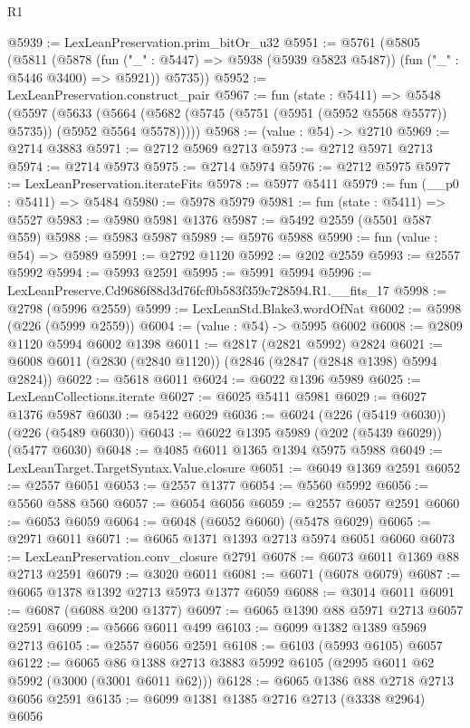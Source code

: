 \begin{lexlean}{R1}
\begin{coremodule}
@5939 := LexLeanPreservation.prim_bitOr_u32
@5951 := @5761
    (@5805
      (@5811
        (@5878 (fun ("_" : @5447) => @5938 (@5939 @5823 @5487)) (fun ("_" : @5446 @3400) => @5921))
        @5735))
@5952 := LexLeanPreservation.construct_pair
@5967 := fun (state : @5411) =>
  @5548
    (@5597
      (@5633 (@5664 (@5682 (@5745 (@5751 (@5951 (@5952 @5568 @5577)) @5735)) (@5952 @5564 @5578)))))
@5968 := (value : @54) -> @2710
@5969 := @2714 @3883
@5971 := @2712 @5969 @2713
@5973 := @2712 @5971 @2713
@5974 := @2714 @5973
@5975 := @2714 @5974
@5976 := @2712 @5975
@5977 := LexLeanPreservation.iterateFits
@5978 := @5977 @5411
@5979 := fun (__p0 : @5411) => @5484
@5980 := @5978 @5979
@5981 := fun (state : @5411) => @5527
@5983 := @5980 @5981 @1376
@5987 := @5492 @2559 (@5501 @587 @559)
@5988 := @5983 @5987
@5989 := @5976 @5988
@5990 := fun (value : @54) => @5989
@5991 := @2792 @1120
@5992 := @202 @2559
@5993 := @2557 @5992
@5994 := @5993 @2591
@5995 := @5991 @5994
@5996 := LexLeanPreserve.Cd9686f88d3d76fcf0b583f359c728594.R1.__fits_17
@5998 := @2798 (@5996 @2559)
@5999 := LexLeanStd.Blake3.wordOfNat
@6002 := @5998 (@226 (@5999 @2559))
@6004 := (value : @54) -> @5995 @6002
@6008 := @2809 @1120 @5994 @6002 @1398
@6011 := @2817 (@2821 @5992) @2824
@6021 := @6008 @6011 (@2830 (@2840 @1120)) (@2846 (@2847 (@2848 @1398) @5994 @2824))
@6022 := @5618 @6011
@6024 := @6022 @1396 @5989
@6025 := LexLeanCollections.iterate
@6027 := @6025 @5411 @5981
@6029 := @6027 @1376 @5987
@6030 := @5422 @6029
@6036 := @6024 (@226 (@5419 @6030)) (@226 (@5489 @6030))
@6043 := @6022 @1395 @5989 (@202 (@5439 @6029)) (@5477 @6030)
@6048 := @4085 @6011 @1365 @1394 @5975 @5988
@6049 := LexLeanTarget.TargetSyntax.Value.closure
@6051 := @6049 @1369 @2591
@6052 := @2557 @6051
@6053 := @2557 @1377
@6054 := @5560 @5992
@6056 := @5560 @588 @560
@6057 := @6054 @6056
@6059 := @2557 @6057 @2591
@6060 := @6053 @6059
@6064 := @6048 (@6052 @6060) (@5478 @6029)
@6065 := @2971 @6011
@6071 := @6065 @1371 @1393 @2713 @5974 @6051 @6060
@6073 := LexLeanPreservation.conv_closure @2791
@6078 := @6073 @6011 @1369 @88 @2713 @2591
@6079 := @3020 @6011
@6081 := @6071 (@6078 @6079)
@6087 := @6065 @1378 @1392 @2713 @5973 @1377 @6059
@6088 := @3014 @6011
@6091 := @6087 (@6088 @200 @1377)
@6097 := @6065 @1390 @88 @5971 @2713 @6057 @2591
@6099 := @5666 @6011 @499
@6103 := @6099 @1382 @1389 @5969 @2713
@6105 := @2557 @6056 @2591
@6108 := @6103 (@5993 @6105) @6057
@6122 := @6065 @86 @1388 @2713 @3883 @5992 @6105 (@2995 @6011 @62 @5992 (@3000 (@3001 @6011 @62)))
@6128 := @6065 @1386 @88 @2718 @2713 @6056 @2591
@6135 := @6099 @1381 @1385 @2716 @2713 (@3338 @2964) @6056

\end{coremodule}
\end{lexlean}
